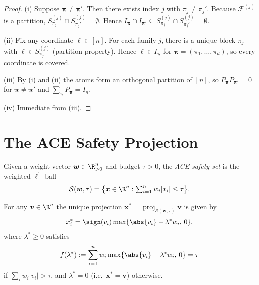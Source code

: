 \documentclass[11pt]{article}
\begin{document}
\begin{proof}
(i) Suppose $\bm{\pi}\neq\bm{\pi}'$.  Then there exists index $j$ with
$\pi_j \neq \pi_j'$.  Because $\mathcal{F}^{(j)}$ is a partition,
$S^{(j)}_{\pi_j}\cap S^{(j)}_{\pi_j'}=\emptyset$.  Hence
$I_{\bm{\pi}}\cap I_{\bm{\pi}'} \subseteq S^{(j)}_{\pi_j}\cap S^{(j)}_{\pi_j'}=\emptyset$.
\smallskip

(ii) Fix any coordinate $\ell\in[n]$.  For each family $j$, there is a unique
block $\pi_j$ with $\ell\in S^{(j)}_{\pi_j}$ (partition property).  Hence
$\ell \in I_{\bm{\pi}}$ for $\bm{\pi}=(\pi_1,\dots,\pi_d)$, so every
coordinate is covered.
\smallskip

(iii) By (i) and (ii) the atoms form an orthogonal partition of $[n]$, so
$P_{\bm{\pi}}P_{\bm{\pi}'}=0$ for $\bm{\pi}\neq\bm{\pi}'$ and
$\sum_{\bm{\pi}} P_{\bm{\pi}} = I_n$.
\smallskip

(iv) Immediate from (iii).
\end{proof}

\section{The ACE Safety Projection}

\begin{definition}
Given a weight vector $\bm{w}\in\R^n_{>0}$ and budget $\tau>0$, the
\emph{ACE safety set} is the weighted $\ell^1$ ball
\[
  \mathcal{S}(\bm{w},\tau)
  = \bigl\{\bm{x}\in\R^n : \textstyle\sum_{i=1}^n w_i|x_i| \leq \tau\bigr\}.
\]
\end{definition}

\begin{theorem}
\label{thm:l1proj}
For any $\bm{v}\in\R^n$ the unique projection
$\bm{x}^* = \operatorname{proj}_{\mathcal{S}(\bm{w},\tau)}\bm{v}$
is given by
\[
  x^*_i = \sign(v_i)\max\{\abs{v_i} - \lambda^* w_i,\,0\},
\]
where $\lambda^* \geq 0$ satisfies
\[
  f(\lambda^*) := \sum_{i=1}^n w_i\max\{\abs{v_i}-\lambda^* w_i,\,0\} = \tau
\]
if $\sum_i w_i|v_i| > \tau$, and $\lambda^* = 0$ (i.e.\ $\bm{x}^*=\bm{v}$)
otherwise.
\end{theorem}
\end{document}

